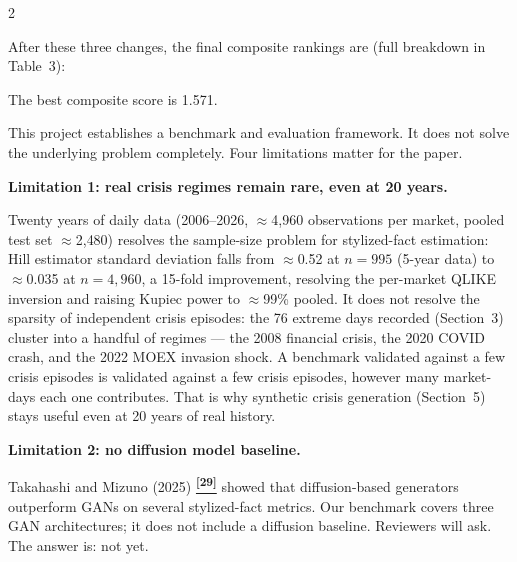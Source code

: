 \documentclass[10pt]{article}
\newcommand{\purplebox}[2]{\begin{tcolorbox}[mybox={Purple}{LBg},title={#1}]#2\end{tcolorbox}}
\newcommand{\tcite}[1]{%
  \hyperlink{R:#1}{\textsuperscript{\scriptsize\textbf{[#1]}}}}
\begin{document}
\begin{multicols}{2}
{\medskip
After these three changes, the final composite rankings are (full breakdown in
Table~3):


\smallskip
The best composite score is 1.571.}

\columnbreak

\purplebox{9\quad What We Still Cannot Do}{%
This project establishes a benchmark and evaluation framework. It does not solve the underlying problem completely. Four limitations matter for the paper.

\medskip
\textbf{Limitation 1: real crisis regimes remain rare, even at 20 years.}

Twenty years of daily data (2006--2026, $\approx$4{,}960 observations per market, pooled test set $\approx$2{,}480) resolves the sample-size problem for stylized-fact estimation: Hill estimator standard deviation falls from $\approx$0.52 at $n=995$ (5-year data) to $\approx$0.035 at $n=4{,}960$, a 15-fold improvement, resolving the per-market QLIKE inversion and raising Kupiec power to $\approx$99\% pooled. It does not resolve the sparsity of independent crisis episodes: the 76 extreme days recorded (Section~3) cluster into a handful of regimes --- the 2008 financial crisis, the 2020 COVID crash, and the 2022 MOEX invasion shock. A benchmark validated against a few crisis episodes is validated against a few crisis episodes, however many market-days each one contributes. That is why synthetic crisis generation (Section~5) stays useful even at 20 years of real history.

\medskip
\textbf{Limitation 2: no diffusion model baseline.}

Takahashi and Mizuno (2025)\tcite{29} showed that diffusion-based generators outperform GANs on several stylized-fact metrics. Our benchmark covers three GAN architectures; it does not include a diffusion baseline. Reviewers will ask. The answer is: not yet.

}
\end{multicols}
\end{document}
